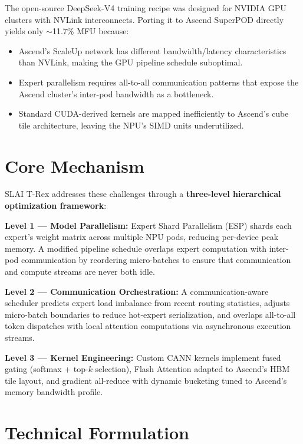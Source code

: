 \documentclass[10pt,twocolumn]{article}
\begin{document}
The open-source DeepSeek-V4 training recipe was designed for NVIDIA
GPU clusters with NVLink interconnects. Porting it to Ascend SuperPOD
directly yields only $\sim$11.7\% MFU because:

\begin{itemize}[itemsep=2pt,parsep=0pt]
  \item Ascend's ScaleUp network has different bandwidth/latency
    characteristics than NVLink, making the GPU pipeline schedule
    suboptimal.
  \item Expert parallelism requires all-to-all communication patterns
    that expose the Ascend cluster's inter-pod bandwidth as a bottleneck.
  \item Standard CUDA-derived kernels are mapped inefficiently to
    Ascend's cube tile architecture, leaving the NPU's SIMD units
    underutilized.
\end{itemize}

\section{Core Mechanism}

SLAI T-Rex addresses these challenges through a \textbf{three-level
hierarchical optimization framework}:

\textbf{Level 1 --- Model Parallelism:} Expert Shard Parallelism (ESP)
shards each expert's weight matrix across multiple NPU pods, reducing
per-device peak memory. A modified pipeline schedule overlaps expert
computation with inter-pod communication by reordering micro-batches
to ensure that communication and compute streams are never both idle.

\textbf{Level 2 --- Communication Orchestration:} A communication-aware
scheduler predicts expert load imbalance from recent routing statistics,
adjusts micro-batch boundaries to reduce hot-expert serialization, and
overlaps all-to-all token dispatches with local attention computations
via asynchronous execution streams.

\textbf{Level 3 --- Kernel Engineering:} Custom CANN kernels implement
fused gating (softmax + top-$k$ selection), Flash Attention adapted
to Ascend's HBM tile layout, and gradient all-reduce with dynamic
bucketing tuned to Ascend's memory bandwidth profile.

\section{Technical Formulation}
\end{document}
